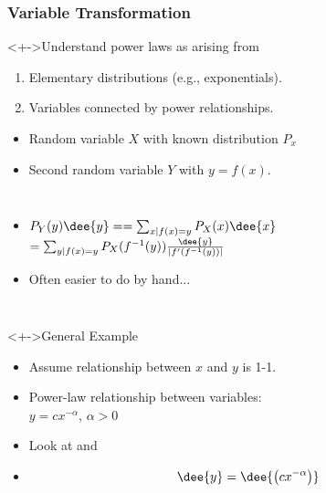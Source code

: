 \begin{frame}
  \frametitle{Variable Transformation}

  \begin{block}<+->{Understand power laws as arising from}
    \begin{enumerate}
    \item<+->
      Elementary distributions (e.g., exponentials).
    \item<+->
      Variables connected by power relationships.
    \end{enumerate}
  \end{block}

  \begin{block}{}
  \begin{itemize}
  \item<+-> 
    Random variable $X$ with known distribution $P_x$
  \item<+-> 
    Second random variable $Y$ with $y=f(x)$.
  \end{itemize}
  \begin{columns}
    \begin{itemize}
    \item<+-> 
      $ P_Y(y) \dee{y} = = \sum_{x | f(x) = y} P_X(x) \dee{x} $ \\
      $ = \sum_{y | f(x) = y}
      P_X( f^{-1}(y) )
      \frac{\dee{y}}
      {
        \left|
          f'(f^{-1}(y))
        \right|
      }
      $
    \item<+-> Often easier to do by hand...
    \end{itemize}
  \end{columns}
  \end{block}


\end{frame}

\begin{frame}

  \begin{block}<+->{General Example}
    \begin{itemize}
    \item<+->
      Assume relationship between $x$ and $y$ is 1-1.
    \item<+-> Power-law relationship between variables: \\
      $y = c x^{-\alpha}$, $\alpha > 0$
    \item<+-> Look at  and 
    \item<+-> $$ \dee{y} = \dee{\left(cx^{-\alpha }\right)}  $$
    \end{itemize}
  \end{block}

\end{frame}

